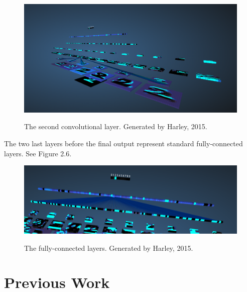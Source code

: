\begin{figure}[!ht]
  \centering
  \includegraphics[scale=0.4]{figures/conv4.png}  
  \caption[The second convolutional layer. Generated by Harley, 2015.]{The second convolutional layer. Generated by Harley, 2015.}
  \protect\label{fig:conv4}
\end{figure}
\FloatBarrier
The two last layers before the final output represent standard fully-connected layers. See Figure 2.6.

\begin{figure}[!ht]
  \centering
  \includegraphics[scale=0.7]{figures/conv5.png}  
  \caption[The fully-connected layers. Generated by Harley, 2015.]{The fully-connected layers. Generated by Harley, 2015.}
  \protect\label{fig:conv5}
\end{figure}
\FloatBarrier

\section{Previous Work}
